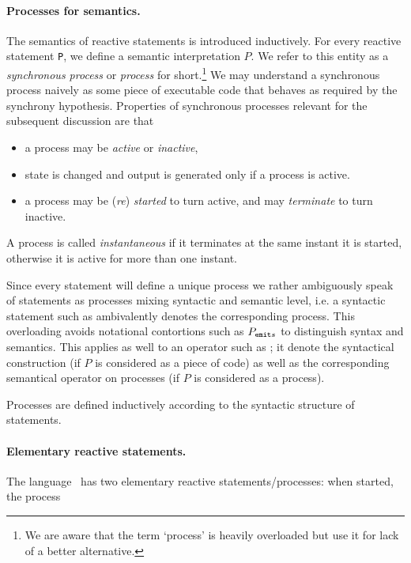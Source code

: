 \paragraph{Processes for semantics.} The semantics of reactive
statements is introduced inductively.  For every reactive statement
\texttt{P}, we define a semantic interpretation $P$.  We refer to this
entity as a \emph{synchronous process}
 or \emph{process}
 for
short.\footnote{We are aware that the term `process' is heavily
overloaded but use it for lack of a better alternative.}
We may understand a synchronous process naively as some piece of executable code that behaves as required by the synchrony hypothesis.  Properties of
synchronous processes relevant for the subsequent discussion are that
\begin{itemize}
	\item  a process may be \emph{active}
 or \textit{inactive},

	\item state is changed and output is generated only if a process is
	active.

	\item a process may be (\emph{re}) \emph{started} to turn active,
	and may \textit{terminate} to turn inactive. 
\end{itemize}
A process is called \emph{instantaneous} if it terminates at the same
instant it is started, otherwise it is active for more than one
instant.

Since every statement will define a unique process we rather
ambiguously speak of statements as processes mixing syntactic and
semantic level, i.e. a syntactic statement such as 
ambivalently denotes the corresponding process.  This overloading
avoids notational contortions such as $P_{{\tt emit} s}$ to
distinguish syntax and semantics.  This applies as well to an operator
such as ; it denote the
syntactical construction (if $P$ is considered as a piece of code) 
as well as the corresponding semantical operator on processes
(if $P$ is considered as a process).

Processes are defined inductively according to the syntactic 
structure of statements.


\paragraph{Elementary reactive statements.}
The language \se\ has two elementary reactive statements/processes:
when started, the process

